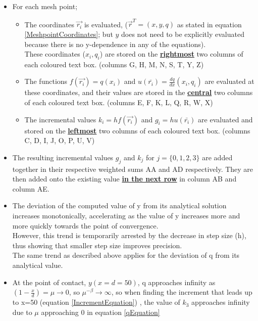 \documentclass[a4paper, 12pt]{article}
\begin{document}
\begin{itemize}
	\item For each mesh point;
	\begin{itemize}
		\item The coordinates $\vec{r_i}$ is evaluated, ($\vec{r}^T = (x,y,q)$ as stated in equation \ref{MeshpointCoordinates}; but $y$ does not need to be explicitly evaluated because there is no y-dependence in any of the equations). \\
		These coordinates ($x_i,q_i$) are stored on the \underline{\textbf{rightmost}} two columns of each coloured text box. (columns G, H, M, N, S, T, Y, Z)
		\item The functions $f(\vec{r_i}) = q(x_i)$ and $u(\bar{r_i}) = \frac{dq}{dx} (x_i,q_i) $ are evaluated at these coordinates, and their values are stored in the \underline{\textbf{central}} two columns of each coloured text box. (columns E, F, K, L, Q, R, W, X)
		\item The incremental values $k_i = hf(\vec{r_i}) $ and $g_i = hu(\bar{r_i})$ are evaluated and stored on the \underline{\textbf{leftmost}} two columns of each coloured text box. (columns C, D, I, J, O, P, U, V)
	\end{itemize}
	\item The resulting incremental values $g_j$ and $k_j$ for $j=\{ 0,1,2,3 \}$ are added together in their respective weighted sums AA and AD respectively. They are then added onto the existing value \underline{\textbf{in the next row}} in column AB and column AE.
	\item The deviation of the computed value of y from its analytical solution increases monotonically, accelerating as the value of y increases more and more quickly towards the point of convergence. \\
	However, this trend is temporarily arrested by the decrease in step size (h), thus showing that smaller step size improves precision. \\
	The same trend as described above applies for the deviation of q from its analytical value.
	\item At the point of contact, $y(x=d=50)$, q approaches infinity as $ (1-\frac{x}{d}) =\mu \to 0$, so $\mu^{-\beta} \to \infty$, so when finding the increment that leads up to x=50 (equation \ref{IncrementEquation}) , the value of $k_3$ approaches infinity due to $\mu$ approaching 0 in equation \ref{qEquation}
\end{itemize}
\end{document}
